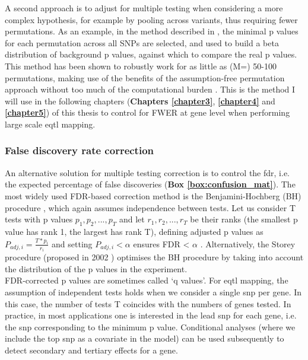 A second approach is to adjust for multiple testing when considering a more complex hypothesis, for example by pooling across variants, thus requiring fewer permutations.
As an example, in the method described in \cite{ongen2016fast}, the minimal p values for each permutation across all SNPs are selected, and used to build a beta distribution of background p values, against which to compare the real p values.
This method has been shown to robustly work for as little as (M=) 50-100 permutations, making use of the benefits of the assumption-free permutation approach without too much of the computational burden \cite{ongen2016fast}. 
This is the method I will use in the following chapters (\textbf{Chapters \ref{chapter3}}, \textbf{\ref{chapter4}} and \textbf{\ref{chapter5}}) of this thesis to control for FWER at gene level when performing large scale \gls{eqtl} mapping.

\subsubsection{False discovery rate correction}

An alternative solution for multiple testing correction is to control the \gls{fdr}, i.e. the expected percentage of false discoveries (\textbf{Box \ref{box:confusion_mat}}).
The most widely used FDR-based correction method is the Benjamini-Hochberg (BH) procedure \cite{benjamini1995controlling}, which again assumes independence between tests. 
Let us consider T tests with p values $p_1, p_2, ..., p_T$ and let $r_1, r_2, ..., r_T$ be their ranks (the smallest p value has rank 1, the largest has rank T), defining adjusted p values as $P_{adj,i} = \frac{T*p_i}{r_i} $ and setting $P_{adj,i} <\alpha$ ensures FDR < $\alpha$ \cite{yekutieli1999resampling}.
Alternatively, the Storey procedure (proposed in 2002 \cite{storey2002direct, storey2003statistical}) optimises the BH procedure by taking into account the distribution of the p values in the experiment.\\

FDR-corrected p values 
are sometimes called `q values'.
For \gls{eqtl} mapping, the assumption of independent tests holds when we consider a single \gls{snp} per gene.
In this case, the number of tests T coincides with the numbers of genes tested.
In practice, in most applications one is interested in the lead \gls{snp} for each gene, i.e. the \gls{snp} corresponding to the minimum p value.
Conditional analyses (where we include the top \gls{snp} as a covariate in the model) can be used subsequently to detect secondary and tertiary effects for a gene.

